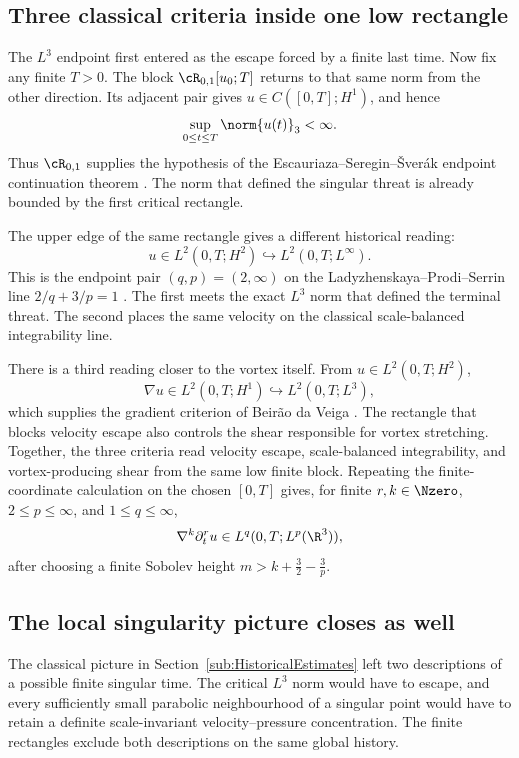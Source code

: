 \subsection{Three classical criteria inside one low rectangle}\label{sub:ClassicalCriteriaInsideFiniteRectangles}

The \(L^3\) endpoint first entered as the escape forced by a finite last time.  Now fix
any finite \(T>0\).  The block \(\cR_{0,1}[u_0;T]\) returns to that same norm from the
other direction.  Its adjacent pair gives \(u\in C([0,T];H^1)\), and hence
\[
  \sup_{0\leq t\leq T}\norm{u(t)}_3<\infty.
\]
Thus \(\cR_{0,1}\) supplies the hypothesis of the Escauriaza--Seregin--\v{S}ver\'ak endpoint continuation theorem \parencite{EscauriazaSereginSverak2003}.
The norm that defined the singular threat is already bounded by the first critical rectangle.

The upper edge of the same rectangle gives a different historical reading:
\[
  u\in L^2(0,T;H^2)
  \hookrightarrow L^2(0,T;L^\infty).
\]
This is the endpoint pair \((q,p)=(2,\infty)\) on the Ladyzhenskaya--Prodi--Serrin line \(2/q+3/p=1\) \parencite{Prodi1959,Serrin1962,Serrin1963,Ladyzhenskaya1967}.
The first meets the exact \(L^3\) norm that defined the terminal threat.  The second
places the same velocity on the classical scale-balanced integrability line.

There is a third reading closer to the vortex itself.  From
\(u\in L^2(0,T;H^2)\),
\[
  \nabla u\in L^2(0,T;H^1)
  \hookrightarrow L^2(0,T;L^3),
\]
which supplies the gradient criterion of Beir\~ao da Veiga
\parencite{BeiraoDaVeiga1995}.  The rectangle that blocks velocity escape also
controls the shear responsible for vortex stretching.  Together, the three criteria
read velocity escape, scale-balanced integrability, and vortex-producing shear from the
same low finite block.  Repeating the finite-coordinate calculation on the chosen
\([0,T]\) gives, for finite \(r,k\in\Nzero\), \(2\leq p\leq\infty\), and
\(1\leq q\leq\infty\),
\[
  \nabla^k\partial_t^ru\in L^q(0,T;L^p(\R^3)),
\]
after choosing a finite Sobolev height
\(m>k+\tfrac32-\tfrac3p\).

\subsection{The local singularity picture closes as well}\label{sub:TheLocalSingularityPictureCloses}

The classical picture in Section~\ref{sub:HistoricalEstimates} left two descriptions of a possible finite singular time.
The critical \(L^3\) norm would have to escape, and every sufficiently small parabolic neighbourhood of a singular point would have to retain a definite scale-invariant velocity--pressure concentration.
The finite rectangles exclude both descriptions on the same global history.

